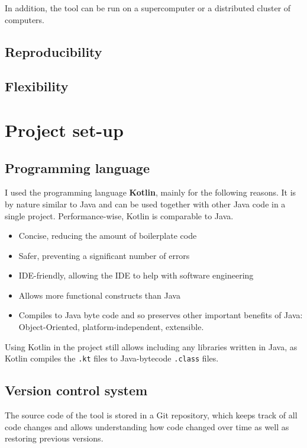 In addition, the tool can be run on a supercomputer or a distributed cluster of computers.


\subsection{Reproducibility}

\subsection{Flexibility}


\section{Project set-up}

\subsection{Programming language}

I used the programming language \textbf{Kotlin}, mainly for the following reasons.
It is by nature similar to Java and can be used together with other Java code in a single project.
Performance-wise, Kotlin is comparable to Java.
\begin{itemize}
    \item Concise, reducing the amount of boilerplate code
    \item Safer, preventing a significant number of errors
    \item IDE-friendly, allowing the IDE to help with software engineering
    \item Allows more functional constructs than Java
    \item Compiles to Java byte code and so preserves other important benefits of Java: Object-Oriented, platform-independent, extensible.
\end{itemize}

Using Kotlin in the project still allows including any libraries written in Java, as Kotlin compiles the \texttt{.kt} files to Java-bytecode \texttt{.class} files.

\subsection{Version control system}

The source code of the \graffs tool is stored in a Git repository, which keeps track of all code changes and allows understanding how code changed over time as well as restoring previous versions.

